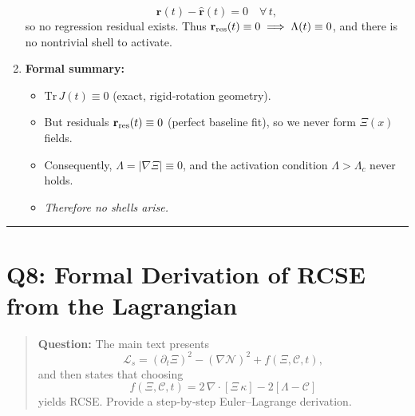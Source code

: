 \documentclass[11pt]{article}
\begin{document}
\begin{enumerate}[itemsep=0.5em]
    \[
      \mathbf r(t)-\hat{\mathbf r}(t) 
      = 0 \quad \forall\,t,
    \]
    so no regression residual exists.  Thus $\mathbf r_{\rm res}(t)\equiv0\implies \Lambda(t)\equiv0$, and there is no nontrivial shell to activate.  
  \item \textbf{Formal summary:}  
    \begin{itemize}[itemsep=0.25em]
      \item $\mathrm{Tr}\,J(t)\equiv0$ (exact, rigid‐rotation geometry).  
      \item But residuals $\mathbf r_{\rm res}(t)\equiv0$ (perfect baseline fit), so we never form $\Xi(x)$ fields.  
      \item Consequently, $\Lambda=|\nabla\Xi|\equiv0$, and the activation condition $\Lambda>\Lambda_c$ never holds.  
      \item \emph{Therefore no shells arise.}  
    \end{itemize}
\end{enumerate}

\vspace{1em}
\hrule

\section*{Q8: Formal Derivation of RCSE from the Lagrangian}
\begin{quote}
\textbf{Question:} The main text presents
\[
  \mathcal L_s = (\partial_t\Xi)^2 - (\nabla\mathcal N)^2 + f(\Xi,\mathcal C,t),
\]
and then states that choosing 
\[
  f(\Xi,\mathcal C,t) = 2\,\nabla\!\cdot[\Xi\,\kappa] - 2[\Lambda - \mathcal C]
\]
yields RCSE. Provide a step‐by‐step Euler–Lagrange derivation.
\end{quote}
\end{document}
